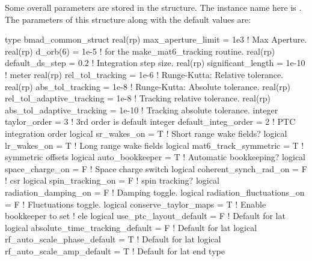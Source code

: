 Some overall parameters are stored in the 
structure. The instance name here is . The parameters of
this structure along with the default values are:
\begin{example}
  type bmad_common_struct
    real(rp) max_aperture_limit = 1e3          ! Max Aperture.
    real(rp) d_orb(6)           = 1e-5         ! for the make_mat6_tracking routine.
    real(rp) default_ds_step    = 0.2          ! Integration step size.  
    real(rp) significant_length = 1e-10        ! meter 
    real(rp) rel_tol_tracking = 1e-6           ! Runge-Kutta: Relative tolerance.
    real(rp) abs_tol_tracking = 1e-8           ! Runge-Kutta: Absolute tolerance.
    real(rp) rel_tol_adaptive_tracking = 1e-8  ! Tracking relative tolerance.
    real(rp) abs_tol_adaptive_tracking = 1e-10 ! Tracking absolute tolerance.
    integer taylor_order = 3                   ! 3rd order is default
    integer default_integ_order = 2            ! PTC integration order
    logical sr_wakes_on = T                    ! Short range wake fields?
    logical lr_wakes_on = T                    ! Long range wake fields
    logical mat6_track_symmetric = T           ! symmetric offsets
    logical auto_bookkeeper = T                ! Automatic bookkeeping?
    logical space_charge_on = F                ! Space charge switch
    logical coherent_synch_rad_on = F          ! csr 
    logical spin_tracking_on = F               ! spin tracking?
    logical radiation_damping_on = F           ! Damping toggle.
    logical radiation_fluctuations_on = F      ! Fluctuations toggle.
    logical conserve_taylor_maps = T           ! Enable bookkeeper to set
                                               ! ele%
    logical use_ptc_layout_default = F         ! Default for lat%
    logical absolute_time_tracking_default = F ! Default for lat%
    logical rf_auto_scale_phase_default = T    ! Default for lat%
    logical rf_auto_scale_amp_default = T      ! Default for lat%
  end type
\end{example}


